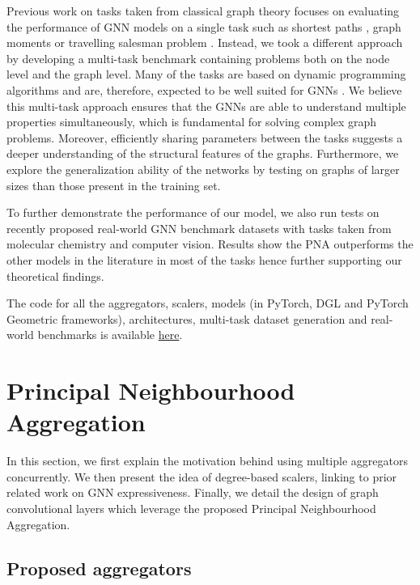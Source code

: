 \documentclass{article}
\begin{document}
Previous work on tasks taken from classical graph theory focuses on evaluating the performance of GNN models on a single task such as shortest paths \cite{velickovic2019neural, xu2019neural, Graves2016}, graph moments \cite{dehmamy2019understanding} or travelling salesman problem \cite{dwivedi2020benchmarking, joshi2019efficient}.
Instead, we took a different approach by developing a multi-task benchmark containing problems both on the node level and the graph level. Many of the tasks are based on dynamic programming algorithms and are, therefore, expected to be well suited for GNNs \cite{xu2019neural}. We believe this multi-task approach ensures that the GNNs are able to understand multiple properties simultaneously, which is fundamental for solving complex graph problems. Moreover, efficiently sharing parameters between the tasks suggests a deeper understanding of the structural features of the graphs. Furthermore, we explore the generalization ability of the networks by testing on graphs of larger sizes than those present in the training set.

To further demonstrate the performance of our model, we also run tests on recently proposed real-world GNN benchmark datasets \cite{dwivedi2020benchmarking, hu2020open} with tasks taken from molecular chemistry and computer vision. Results show the PNA outperforms the other models in the literature in most of the tasks hence further supporting our theoretical findings.

The code for all the aggregators, scalers, models (in PyTorch, DGL and PyTorch Geometric frameworks), architectures, multi-task dataset generation and real-world benchmarks is available \href{https://github.com/lukecavabarrett/pna}{here}.

\section{Principal Neighbourhood Aggregation}

In this section, we first explain the motivation behind using multiple aggregators concurrently. We then present the idea of degree-based scalers, linking to prior related work on GNN expressiveness. Finally, we detail the design of graph convolutional layers which leverage the proposed Principal Neighbourhood Aggregation.


\subsection{Proposed aggregators}
\end{document}
